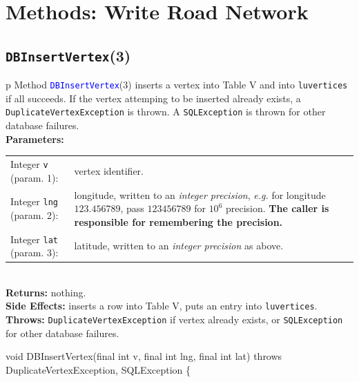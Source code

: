 \section{Methods: Write Road Network}

\subsection{\texttt{DBInsertVertex}(3)}
\begin{tabular}{p{\textwidth}}
\toprule
{}
Method \textcolor{blue}{{\tt{}\protect{}DBInsertVertex}}(3) inserts a vertex into
Table V and into {\tt{}lu{}vertices} if all succeeds. If the vertex attemping
to be inserted already exists, a {\tt{}DuplicateVertexException} is thrown.
A {\tt{}SQLException} is thrown for other database failures.\\
\midrule
\textbf{Parameters:} \\
\begin{tabular}{lp{116mm}}
Integer {\tt{}v} (param. 1):&vertex identifier.\\
Integer {\tt{}lng} (param. 2):&longitude, written to an \emph{integer
precision}, \emph{e.g.} for longitude $123.456789$, pass $123456789$ for
$10^6$ precision. \textbf{The caller is responsible for remembering the
precision.}\\
Integer {\tt{}lat} (param. 3):&latitude, written to an \emph{integer
precision} as above.
\end{tabular}\\
\textbf{Returns:} nothing.\\
\textbf{Side Effects:} inserts a row into Table V, puts an entry into
{\tt{}lu{}vertices}.\\
\textbf{Throws:} {\tt{}DuplicateVertexException} if vertex already exists,
or {\tt{}SQLException} for other database failures.\\
\bottomrule
\end{tabular}
\nwenddocs{}\endmoddef{}
void DBInsertVertex(final int v, final int lng, final int lat)
throws DuplicateVertexException, SQLException \{
\eatline
